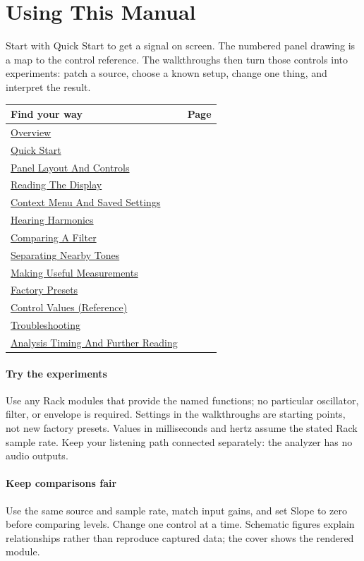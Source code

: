 \section*{Using This Manual}
Start with Quick Start to get a signal on screen. The numbered panel drawing
is a map to the control reference. The walkthroughs then turn those controls
into experiments: patch a source, choose a known setup, change one thing,
and interpret the result.

\begin{center}
\renewcommand{\arraystretch}{1.3}
\begin{tabularx}{\textwidth}{@{}Xr@{}}
\toprule
\textbf{Find your way} & \textbf{Page} \\
\midrule
\hyperref[sec:overview]{Overview} & \pageref{sec:overview} \\
\hyperref[sec:quick-start]{Quick Start} & \pageref{sec:quick-start} \\
\hyperref[sec:panel]{Panel Layout And Controls} & \pageref{sec:panel} \\
\hyperref[sec:display]{Reading The Display} & \pageref{sec:display} \\
\hyperref[sec:settings]{Context Menu And Saved Settings} & \pageref{sec:settings} \\
\hyperref[sec:harmonics]{Hearing Harmonics} & \pageref{sec:harmonics} \\
\hyperref[sec:filter]{Comparing A Filter} & \pageref{sec:filter} \\
\hyperref[sec:resolution]{Separating Nearby Tones} & \pageref{sec:resolution} \\
\hyperref[sec:measurements]{Making Useful Measurements} & \pageref{sec:measurements} \\
\hyperref[sec:presets]{Factory Presets} & \pageref{sec:presets} \\
\hyperref[sec:control-values]{Control Values (Reference)} & \pageref{sec:control-values} \\
\hyperref[sec:troubleshooting]{Troubleshooting} & \pageref{sec:troubleshooting} \\
\hyperref[sec:further-reading]{Analysis Timing And Further Reading} & \pageref{sec:further-reading} \\
\bottomrule
\end{tabularx}
\end{center}

\paragraph{Try the experiments}
Use any Rack modules that provide the named functions; no particular
oscillator, filter, or envelope is required. Settings in the walkthroughs
are starting points, not new factory presets. Values in milliseconds and
hertz assume the stated Rack sample rate. Keep your listening path connected
separately: the analyzer has no audio outputs.

\paragraph{Keep comparisons fair}
Use the same source and sample rate, match input gains, and set Slope to zero
before comparing levels. Change one control at a time. Schematic figures
explain relationships rather than reproduce captured data; the cover shows
the rendered module.
